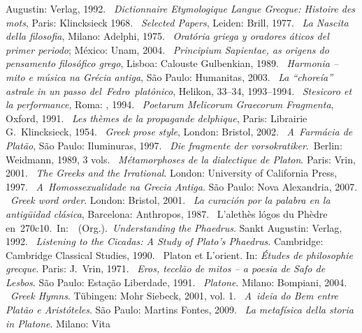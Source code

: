 \begin{bibliohedra}
  Augustin: Verlag, 1992.
~\emph{Dictionnaire Etymologique Langue Grecque: Histoire
  des mots}, Paris: Klincksieck 1968.
~\emph{Selected Papers}, Leiden: Brill, 1977.
~\emph{La Nascita della filosofia}, Milano: Adelphi, 1975.
~\emph{Oratória griega y oradores áticos del primer periodo}; México:
  Unam, 2004.
~\emph{Principium Sapientae, as origens do pensamento
  filosófico grego}, Lisboa: Calouste Gulbenkian, 1989.
~\emph{Harmonia -- mito e música na Grécia antiga}, São
  Paulo: Humanitas, 2003.
~\emph{La ``choreía'' astrale in un passo
  del~Fedro~platônico}, Helikon, 33--34, 1993--1994.
~\emph{Stesicoro et la performance}, Roma: , 1994.
~\emph{Poetarum Melicorum Graecorum Fragmenta}, Oxford,
  1991.
~\emph{Les thèmes de la propagande delphique}, Paris:
  Librairie G.~Klincksieck, 1954.
~\emph{Greek prose style}, London: Bristol, 2002.
~\emph{A~Farmácia de Platão}, São Paulo: Iluminuras, 1997.
~\emph{Die fragmente der
  vorsokratiker}.~Berlin: Weidmann, 1989, 3 vols.
~\emph{Métamorphoses de la dialectique de Platon}. Paris:
  Vrin, 2001.
~\emph{The Greeks and the Irrational}. London: University
  of California Press, 1997.
~\emph{A~Homossexualidade na Grecia Antiga}. São Paulo:
  Nova Alexandria, 2007.
~\emph{Greek word order}. London: Bristol, 2001.
~\emph{La curación por la palabra en la antigüidad
  clásica}, Barcelona: Anthropos, 1987.
~L'alethès lógos du Phèdre
  en~270c10.~In:~~(Org.).~\emph{Understanding the
  Phaedrus}. Sankt Augustin: Verlag, 1992.
~\emph{Listening to the Cicadas: A Study of Plato's
  Phaedrus}. Cambridge: Cambridge Classical Studies, 1990.
~Platon et L'orient. In: \emph{Études de philosophie
  grecque}. Paris: J.~Vrin, 1971.
~\emph{Eros, tecelão de mitos -- a poesia de Safo de
  Lesbos}. São Paulo: Estação Liberdade, 1991.
~\emph{Platone}. Milano: Bompiani, 2004.
~\emph{Greek Hymns}. Tübingen: Mohr
  Siebeck, 2001, vol. 1.
~\emph{A~ideia do Bem entre Platão e Aristóteles}. São
  Paulo: Martins Fontes, 2009.
~\emph{La metafísica della storia in Platone}. Milano: Vita

\end{bibliohedra}
